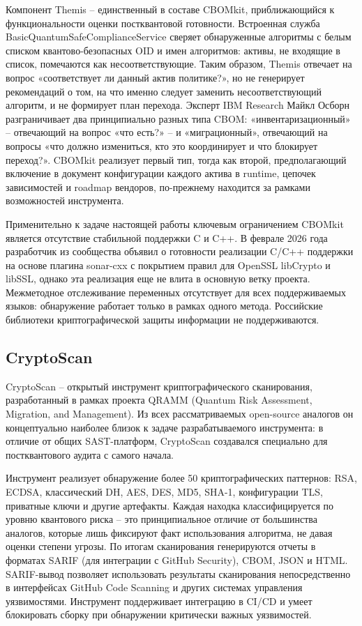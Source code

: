 \documentclass{itmo-vkr}
\begin{document}
	Компонент Themis -- единственный в составе CBOMkit, приближающийся к функциональности оценки постквантовой готовности. Встроенная служба BasicQuantumSafeComplianceService сверяет обнаруженные алгоритмы с белым списком квантово-безопасных OID и имен алгоритмов: активы, не входящие в список, помечаются как несоответствующие. Таким образом, Themis отвечает на вопрос «соответствует ли данный актив политике?», но не генерирует рекомендаций о том, на что именно следует заменить несоответствующий алгоритм, и не формирует план перехода. Эксперт IBM Research Майкл Осборн разграничивает два принципиально разных типа CBOM: «инвентаризационный» -- отвечающий на вопрос «что есть?» -- и «миграционный», отвечающий на вопросы «что должно измениться, кто это координирует и что блокирует переход?». CBOMkit реализует первый тип, тогда как второй, предполагающий включение в документ конфигурации каждого актива в runtime, цепочек зависимостей и roadmap вендоров, по-прежнему находится за рамками возможностей инструмента.
	
	Применительно к задаче настоящей работы ключевым ограничением CBOMkit является отсутствие стабильной поддержки C и C++. В феврале 2026 года разработчик из сообщества объявил о готовности реализации C/C++ поддержки на основе плагина sonar-cxx с покрытием правил для OpenSSL libCrypto и libSSL, однако эта реализация еще не влита в основную ветку проекта. Межметодное отслеживание переменных отсутствует для всех поддерживаемых языков: обнаружение работает только в рамках одного метода. Российские библиотеки криптографической защиты информации не поддерживаются.
	
	\subsection{CryptoScan}
	
	CryptoScan -- открытый инструмент криптографического сканирования, разработанный в рамках проекта QRAMM (Quantum Risk Assessment, Migration, and Management). Из всех рассматриваемых open-source аналогов он концептуально наиболее близок к задаче разрабатываемого инструмента: в отличие от общих SAST-платформ, CryptoScan создавался специально для постквантового аудита с самого начала.
	
	Инструмент реализует обнаружение более 50 криптографических паттернов: RSA, ECDSA, классический DH, AES, DES, MD5, SHA-1, конфигурации TLS, приватные ключи и другие артефакты. Каждая находка классифицируется по уровню квантового риска -- это принципиальное отличие от большинства аналогов, которые лишь фиксируют факт использования алгоритма, не давая оценки степени угрозы. По итогам сканирования генерируются отчеты в форматах SARIF (для интеграции с GitHub Security), CBOM, JSON и HTML. SARIF-вывод позволяет использовать результаты сканирования непосредственно в интерфейсах GitHub Code Scanning и других системах управления уязвимостями. Инструмент поддерживает интеграцию в CI/CD и умеет блокировать сборку при обнаружении критически важных уязвимостей.
	
\end{document}
